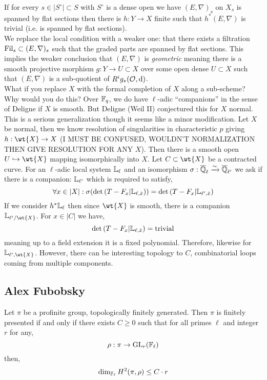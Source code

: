 \documentclass[12pt]{article}
\begin{document}
If for every $s \in |S^\circ| \subset S$ with $S^\circ$ is a dense open we have $(E, \nabla)_s$ on $X_s$ is spanned by flat sections then there is $h : Y \to X$ finite \etale such that $h^*(E, \nabla)$ is trivial (i.e. is spanned by flat sections). 
\bigskip\\
We replace the local condition with a weaker one: that there exists a filtration $\mathrm{Fil}_s \subset (E, \nabla)_s$ such that the graded parts are spanned by flat sections. This implies the weaker conclusion that $(E, \nabla)$ is \textit{geometric} meaning there is a smooth projective morphism $g : Y \to U \subset X$ over some open dense $U \subset X$ such that $(E, \nabla)$ is a sub-quotient of $R^i g_* (\mathcal{O}_{}, \mathrm{d})$. 
\bigskip\\
What if you replace $X$ with the formal completion of $X$ along a sub-scheme? Why would you do this? Over $\mathbb{F}_q$, we do have $\ell$-adic ``companions'' in the sense of Deligne if $X$ is smooth. But Deligne (Weil II) conjectured this for $X$ normal. This is a serious generalization though it seems like a minor modification. Let $X$ be normal, then we know resolution of singularities in characteristic $p$ giving $h : \wt{X} \to X$ (I MUST BE CONFUSED, WOULDN'T NORMALIZATION THEN GIVE RESOLUTION FOR ANY $X$). Then there is a smooth open $U \embed \wt{X}$ mapping isomorphically into $X$. Let $C \subset \wt{X}$ be a contracted curve. For an $\ell$-adic local system $\mathbb{L}_{\ell}$ and an isomorphism $\sigma : \overline{\mathbb{Q}}_{\ell} \xrightarrow{\sim} \overline{\mathbb{Q}}_{\ell'}$ we ask if there is a companion: $\mathbb{L}_{\ell'}$ which is required to satisfy,
\[ \forall x \in |X| : \sigma(\det{(T - F_x | \mathbb{L}_{\ell, \bar{x}})}) = \det{(T - F_x | \mathbb{L}_{\ell', \bar{x}})} \]
If we consider $h^* \mathbb{L}_{\ell}$ then since $\wt{X}$ is smooth, there is a companion $\LL_{\ell'/\wt{X}}$. For $x \in |C|$ we have,
\[ \det{(T - F_x | \mathbb{L}_{\ell, \bar{x}})} = \text{trivial} \]
meaning up to a field extension it is a fixed polynomial. Therefore, likewise for $\LL_{\ell', \wt{X}}$. However, there can be interesting topology to $C$, combinatorial loops coming from multiple components.

\subsection{Alex Fubobsky}

\begin{theorem}
Let $\pi$ be a profinite group, topologically finitely generated. Then $\pi$ is finitely presented if and only if there exists $C \ge 0$ such that for all primes $\ell$ and integer $r$ for any,
\[ \rho : \pi \to \mathrm{GL}_r(\mathbb{F}_\ell) \]
then,
\[ \dim_{\mathbb{F}_\ell} H^2(\pi, \rho) \le C \cdot r \]
\end{theorem}
\end{document}
